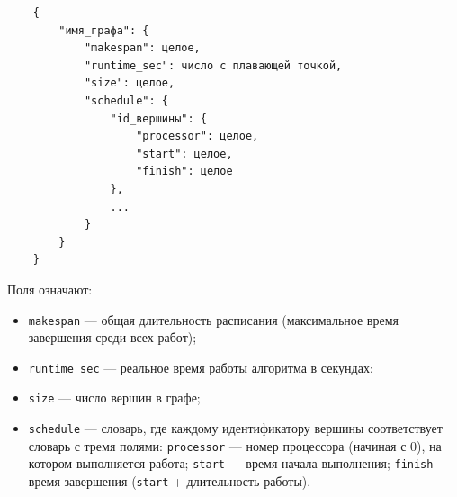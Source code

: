 \begin{verbatim}
	{
		"имя_графа": {
			"makespan": целое,
			"runtime_sec": число с плавающей точкой,
			"size": целое,
			"schedule": {
				"id_вершины": {
					"processor": целое,
					"start": целое,
					"finish": целое
				},
				...
			}
		}
	}
\end{verbatim}

Поля означают:
\begin{itemize}
	\item \texttt{makespan} — общая длительность расписания (максимальное время завершения среди всех работ);
	\item \texttt{runtime\_sec} — реальное время работы алгоритма в секундах;
	\item \texttt{size} — число вершин в графе;
	\item \texttt{schedule} — словарь, где каждому идентификатору вершины соответствует словарь с тремя полями: \texttt{processor} — номер процессора (начиная с 0), на котором выполняется работа; \texttt{start} — время начала выполнения; \texttt{finish} — время завершения (\texttt{start} + длительность работы).
\end{itemize}
